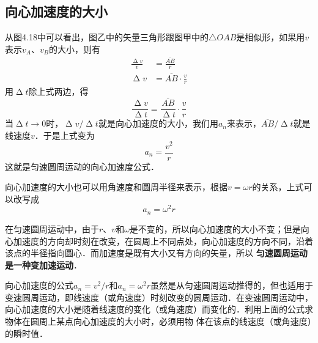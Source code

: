 \subsection{向心加速度的大小}

从图4.18中可以看出，图乙中的矢量三角形跟图甲中的$\triangle OAB$是相似形，如果用$v$表示$v_A$、$v_B$的大小，则有
\[\begin{split}
        \frac{\upDelta v}{v} & =\frac{\overline{AB}}{r}         \\
        \upDelta v           & = \overline{AB}\cdot \frac{v}{r}
    \end{split} \]
用$\upDelta t$除上式两边，得
\[\frac{\upDelta v}{\upDelta t}=\frac{\overline{AB}}{\upDelta t}\cdot \frac{v}{r} \]
当$\upDelta t\to 0$时，$\upDelta v/\upDelta t$就是向心加速度的大小，我们用$a_n$来表示，$\overline{AB}/\upDelta t$就是线速度$v$．于是上式变为
\begin{equation}
    a_n=\frac{v^2}{r}
\end{equation}
这就是匀速圆周运动的向心加速度公式．

向心加速度的大小也可以用角速度和圆周半径来表示，根据$v=\omega r$的关系，上式可以改写成
\begin{equation}
    a_n=\omega^2 r
\end{equation}

在匀速圆周运动中，由于$r$、$v$和$\omega$是不变的，所以向心加速度的大小不变；但是向心加速度的方向却时刻在改变，在圆周上不同点处，向心加速度的方向不同，沿着该点的半径指向圆心．而加速度是既有大小又有方向的矢量，所以\textbf{ 匀速圆周运动是一种变加速运动}．

向心加速度的公式$a_n=v^2/r$和$a_n=\omega^2 r$虽然是从匀速圆周运动推得的，但也适用于变速圆周运动，即线速度（或角速度）时刻改变的圆周运动．在变速圆周运动中，向心加速度的大小是随着线速度的变化（或角速度）而变化的．利用上面的公式求物体在圆周上某点向心加速度的大小时，必须用物
体在该点的线速度（或角速度）的瞬时值．

